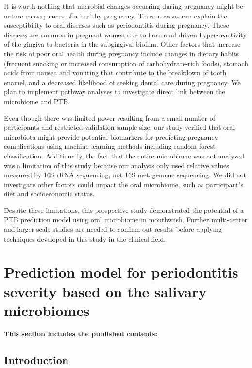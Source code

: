 \documentclass[11pt, a4paper, onecolumn, oneside]{report}
\begin{document}
            It is worth nothing that microbial changes occurring during pregnancy might be nature consequences of a healthy pregnancy. Three reasons can explain the susceptibility to oral diseases such as periodontitis during pregnancy. These diseases are common in pregnant women due to hormonal driven hyper-reactivity of the gingiva to bacteria in the subgingival biofilm. Other factors that increase the risk of poor oral health during pregnancy include changes in dietary habits (frequent snacking or increased consumption of carbohydrate-rich foods), stomach acids from nausea and vomiting that contribute to the breakdown of tooth enamel, and a decreased likelihood of seeking dental care during pregnancy. We plan to implement pathway analyses to investigate direct link between the microbiome and PTB.

            Even though there was limited power resulting from a small number of participants and restricted validation sample size, our study verified that oral microbiota might provide potential biomarkers for predicting pregnancy complications using machine learning methods including random forest classification. Additionally, the fact that the entire microbiome was not analyzed was a limitation of this study because our analysis only used relative values measured by 16S rRNA sequencing, not 16S metagenome sequencing. We did not investigate other factors could impact the oral microbiome, such as participant’s diet and socioeconomic status.

            Despite these limitations, this prospective study demonstrated the potential of a PTB prediction model using oral microbiome in mouthwash. Further multi-center and larger-scale studies are needed to confirm out results before applying techniques developed in this study in the clinical field.
        \newpage

    \section{Prediction model for periodontitis severity based on the salivary microbiomes}
        \label{section:Periodontitis}

        \textbf{This section includes the published contents:} \\

        \subsection{Introduction}
        \newpage
\end{document}

